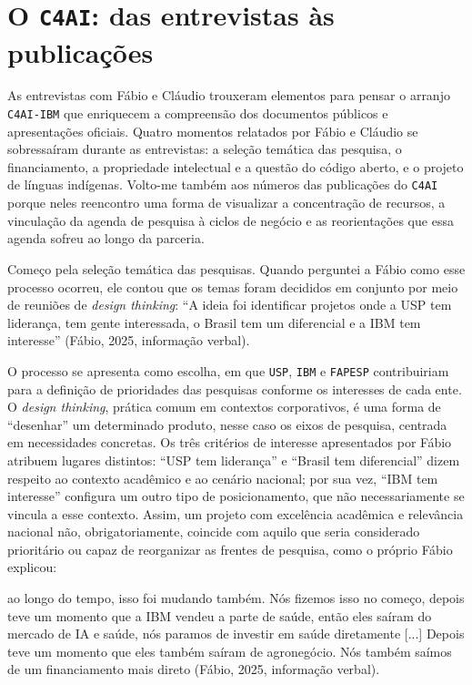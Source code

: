 \section{O \texttt{C4AI}: das entrevistas às publicações}
\label{sec:entrevistas}

As entrevistas com Fábio e Cláudio trouxeram elementos para pensar o arranjo \texttt{C4AI-IBM} que enriquecem a compreensão dos documentos públicos e apresentações oficiais. Quatro momentos relatados por Fábio e Cláudio se sobressaíram durante as entrevistas: a seleção temática das pesquisa, o financiamento, a propriedade intelectual e a questão do código aberto, e o projeto de línguas indígenas. Volto-me também aos números das publicações do \texttt{C4AI} porque neles reencontro uma forma de visualizar a concentração de recursos, a vinculação da agenda de pesquisa à ciclos de negócio e as reorientações que essa agenda sofreu ao longo da parceria.

Começo pela seleção temática das pesquisas. Quando perguntei a Fábio como esse processo ocorreu, ele contou que os temas foram decididos em conjunto por meio de reuniões de \emph{design thinking}: \enquote{A ideia foi identificar projetos onde a USP tem liderança, tem gente interessada, o Brasil tem um diferencial e a IBM tem interesse} (Fábio, 2025, informação verbal).

O processo se apresenta como escolha, em que \texttt{USP}, \texttt{IBM} e \texttt{FAPESP} contribuiriam para a definição de prioridades das pesquisas conforme os interesses de cada ente. O \emph{design thinking}, prática comum em contextos corporativos, é uma forma de \enquote{desenhar} um determinado produto, nesse caso os eixos de pesquisa, centrada em necessidades concretas. Os três critérios de interesse apresentados por Fábio atribuem lugares distintos: \enquote{USP tem liderança} e \enquote{Brasil tem diferencial} dizem respeito ao contexto acadêmico e ao cenário nacional; por sua vez, \enquote{IBM tem interesse} configura um outro tipo de posicionamento, que não necessariamente se vincula a esse contexto. Assim, um projeto com excelência acadêmica e relevância nacional não, obrigatoriamente, coincide com aquilo que seria considerado prioritário ou capaz de reorganizar as frentes de pesquisa, como o próprio Fábio explicou:

\begin{citacaoabnt}
[...] ao longo do tempo, isso foi mudando também. Nós fizemos isso no começo, depois teve um momento que a IBM vendeu a parte de saúde, então eles saíram do mercado de IA e saúde, nós paramos de investir em saúde diretamente [...] Depois teve um momento que eles também saíram de agronegócio. Nós também saímos de um financiamento mais direto (Fábio, 2025, informação verbal).
\end{citacaoabnt}

